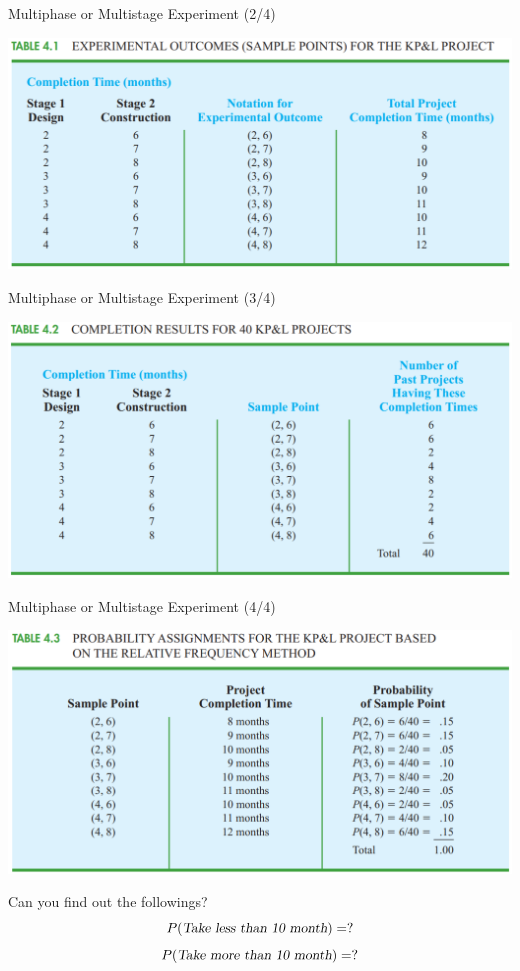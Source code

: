 \documentclass{beamer}
\begin{document}
\begin{frame}{Multiphase or Multistage Experiment (2/4)}

\includegraphics[scale=0.4]{images/ch3MultiPhaseProject.png}

\end{frame}



\begin{frame}{Multiphase or Multistage Experiment (3/4)}

\includegraphics[scale=0.4]{images/ch3MultiPhaseProject2.png}

\end{frame}



\begin{frame}{Multiphase or Multistage Experiment (4/4)}

\includegraphics[scale=0.4]{images/ch3MultiPhaseProject3.png}

Can you find out the followings? 
$$ P(\textsl{Take less than 10 month}) = ?  $$
$$ P(\textsl{Take more than 10 month}) = ?  $$

\end{frame}
\end{document}
